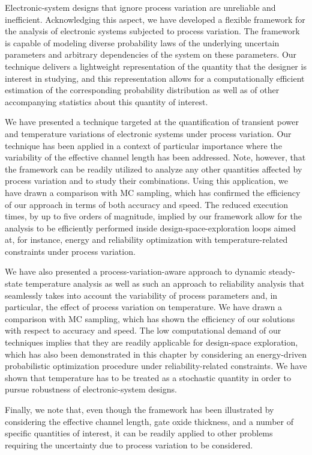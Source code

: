 Electronic-system designs that ignore process variation are unreliable and
inefficient. Acknowledging this aspect, we have developed a flexible framework
for the analysis of electronic systems subjected to process variation. The
framework is capable of modeling diverse probability laws of the underlying
uncertain parameters and arbitrary dependencies of the system on these
parameters. Our technique delivers a lightweight representation of the quantity
that the designer is interest in studying, and this representation allows for a
computationally efficient estimation of the corresponding probability
distribution as well as of other accompanying statistics about this quantity of
interest.

We have presented a technique targeted at the quantification of transient power
and temperature variations of electronic systems under process variation. Our
technique has been applied in a context of particular importance where the
variability of the effective channel length has been addressed. Note, however,
that the framework can be readily utilized to analyze any other quantities
affected by process variation and to study their combinations. Using this
application, we have drawn a comparison with \ac{MC} sampling, which has
confirmed the efficiency of our approach in terms of both accuracy and speed.
The reduced execution times, by up to five orders of magnitude, implied by our
framework allow for the analysis to be efficiently performed inside
design-space-exploration loops aimed at, for instance, energy and reliability
optimization with temperature-related constraints under process variation.

We have also presented a process-variation-aware approach to dynamic
steady-state temperature analysis as well as such an approach to reliability
analysis that seamlessly takes into account the variability of process
parameters and, in particular, the effect of process variation on temperature.
We have drawn a comparison with \ac{MC} sampling, which has shown the efficiency
of our solutions with respect to accuracy and speed. The low computational
demand of our techniques implies that they are readily applicable for
design-space exploration, which has also been demonstrated in this chapter by
considering an energy-driven probabilistic optimization procedure under
reliability-related constraints. We have shown that temperature has to be
treated as a stochastic quantity in order to pursue robustness of
electronic-system designs.

Finally, we note that, even though the framework has been illustrated by
considering the effective channel length, gate oxide thickness, and a number of
specific quantities of interest, it can be readily applied to other problems
requiring the uncertainty due to process variation to be considered.
